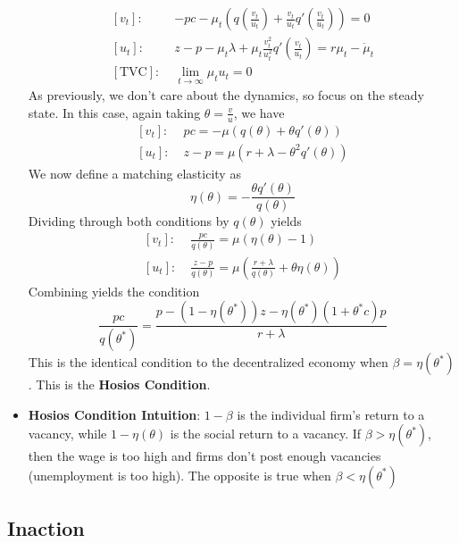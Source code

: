 \documentclass[12pt]{article}
\begin{document}
\begin{itemize}
\[\begin{split}
        [v_t]:\;& -pc- \mu_t\left(q\left(\frac{v_t}{u_t}\right)+ \frac{v_t}{u_t}q'\left(\frac{v_t}{u_t}\right)\right) = 0 \\
        [u_t]:\;& z-p-\mu_t\lambda + \mu_t\frac{v_t^2}{u_t^2}q'\left(\frac{v_t}{u_t}\right) = r\mu_t - \dot{\mu}_t \\
        [\text{TVC}]:\;& \lim_{t\to\infty}\mu_tu_t = 0
    \end{split}\]
    As previously, we don't care about the dynamics, so focus on the steady state. In this case, again taking $\theta = \frac{v}{u}$, we have
    \[\begin{split}
        [v_t]:\;& pc =-\mu(q(\theta) + \theta q'(\theta)) \\
        [u_t]:\;&z - p = \mu(r+\lambda - \theta^2q'(\theta))
    \end{split}\]
    We now define a matching elasticity as 
    \[\eta(\theta) = -\frac{\theta q'(\theta)}{q(\theta)}\]
    Dividing through both conditions by $q(\theta)$ yields
    \[\begin{split}
        [v_t]:\;& \frac{pc}{q(\theta)} =\mu(\eta(\theta)-1) \\
        [u_t]:\;&\frac{z - p}{q(\theta)} = \mu\left(\frac{r+\lambda}{q(\theta)} + \theta\eta(\theta)\right)
    \end{split}\]
    Combining yields the condition
    \[\frac{pc}{q(\theta^*)} = \frac{p - (1-\eta(\theta^*))z - \eta(\theta^*)(1+\theta^*c)p}{r+\lambda}\]
    This is the identical condition to the decentralized economy when $\beta = \eta(\theta^*)$. This is the \textbf{Hosios Condition}. 
    \item \textbf{Hosios Condition Intuition}: $1-\beta$ is the individual firm's return to a vacancy, while $1-\eta(\theta)$ is the social return to a vacancy. If $\beta > \eta(\theta^*)$, then the wage is too high and firms don't post enough vacancies (unemployment is too high). The opposite is true when $\beta < \eta(\theta^*)$
\end{itemize}

\subsection{Inaction}
\end{document}
